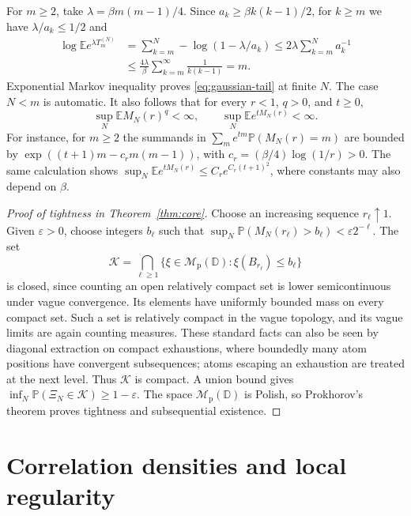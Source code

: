 \documentclass[11pt,a4paper]{article}
\numberwithin{equation}{section}
\theoremstyle{definition}
\theoremstyle{remark}
\newcommand{\D}{\mathbb D}
\newcommand{\E}{\mathbb E}
\newcommand{\Pbb}{\mathbb P}
\newcommand{\Mp}{\mathcal M_{\mathrm p}}
\begin{document}
For $m\ge2$, take $\lambda=\beta m(m-1)/4$. Since
$a_k\ge\beta k(k-1)/2$, for $k\ge m$ we have $\lambda/a_k\le1/2$ and
\begin{align*}
 \log\E e^{\lambda T_m^{(N)}}
 &=\sum_{k=m}^N-\log(1-\lambda/a_k)
 \le2\lambda\sum_{k=m}^N a_k^{-1}\\
 &\le\frac{4\lambda}{\beta}\sum_{k=m}^\infty\frac1{k(k-1)}=m.
\end{align*}
Exponential Markov inequality proves \eqref{eq:gaussian-tail} at finite
$N$. The case $N<m$ is automatic. It also follows that for every
$r<1$, $q>0$, and $t\ge0$,
\begin{equation}\label{eq:uniform-moments}
 \sup_N\E M_N(r)^q<\infty,
 \qquad \sup_N\E e^{tM_N(r)}<\infty.
\end{equation}
For instance, for $m\ge2$ the summands in
$\sum_m e^{tm}\Pbb(M_N(r)=m)$ are bounded by
$\exp((t+1)m-c_rm(m-1))$, with $c_r=(\beta/4)\log(1/r)>0$.
The same calculation shows $\sup_N\E e^{tM_N(r)}\le C_r e^{C_r(t+1)^2}$,
where constants may also depend on $\beta$.

\begin{proof}[Proof of tightness in Theorem~\ref{thm:core}]
Choose an increasing sequence $r_\ell\uparrow1$. Given $\varepsilon>0$,
choose integers $b_\ell$ such that
$\sup_N\Pbb(M_N(r_\ell)>b_\ell)<\varepsilon2^{-\ell}$.
The set
\[
 \mathcal K=\bigcap_{\ell\ge1}
       \{\xi\in\Mp(\D):\xi(B_{r_\ell})\le b_\ell\}
\]
is closed, since counting an open relatively compact set is lower
semicontinuous under vague convergence. Its elements have uniformly
bounded mass on every compact set. Such a set is relatively compact in
the vague topology, and its vague limits are again counting measures.
These standard facts can also be seen by diagonal extraction on compact
exhaustions, where boundedly many atom positions have convergent
subsequences; atoms escaping an exhaustion are treated at the next level.
Thus $\mathcal K$ is compact. A union bound gives
$\inf_N\Pbb(\Xi_N\in\mathcal K)\ge1-\varepsilon$.
The space $\Mp(\D)$ is Polish, so Prokhorov's theorem proves tightness
and subsequential existence.
\end{proof}

\section{Correlation densities and local regularity}
\label{hier:section}
\label{sec:hierarchy}
\end{document}
